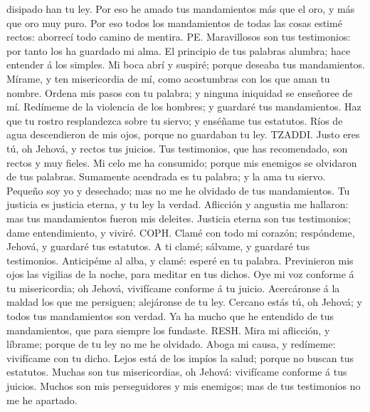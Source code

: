 disipado han tu ley.  Por eso he amado tus mandamientos
más que el oro, y más que oro muy puro.  Por eso todos los
mandamientos de todas las cosas estimé rectos: aborrecí todo camino de
mentira.  PE. Maravillosos son tus testimonios: por tanto
los ha guardado mi alma.  El principio de tus palabras
alumbra; hace entender á los simples.  Mi boca abrí y
suspiré; porque deseaba tus mandamientos.  Mírame, y ten
misericordia de mí, como acostumbras con los que aman tu nombre.
 Ordena mis pasos con tu palabra; y ninguna iniquidad se
enseñoree de mí.  Redímeme de la violencia de los hombres;
y guardaré tus mandamientos.  Haz que tu rostro
resplandezca sobre tu siervo; y enséñame tus estatutos. 
Ríos de agua descendieron de mis ojos, porque no guardaban tu ley.
 TZADDI. Justo eres tú, oh Jehová, y rectos tus juicios.
 Tus testimonios, que has recomendado, son rectos y muy
fieles.  Mi celo me ha consumido; porque mis enemigos se
olvidaron de tus palabras.  Sumamente acendrada es tu
palabra; y la ama tu siervo.  Pequeño soy yo y desechado;
mas no me he olvidado de tus mandamientos.  Tu justicia es
justicia eterna, y tu ley la verdad.  Aflicción y angustia
me hallaron: mas tus mandamientos fueron mis deleites. 
Justicia eterna son tus testimonios; dame entendimiento, y viviré.
 COPH. Clamé con todo mi corazón; respóndeme, Jehová, y
guardaré tus estatutos.  A ti clamé; sálvame, y guardaré
tus testimonios.  Anticipéme al alba, y clamé: esperé en
tu palabra.  Previnieron mis ojos las vigilias de la
noche, para meditar en tus dichos.  Oye mi voz conforme á
tu misericordia; oh Jehová, vivifícame conforme á tu juicio.
 Acercáronse á la maldad los que me persiguen; alejáronse
de tu ley.  Cercano estás tú, oh Jehová; y todos tus
mandamientos son verdad.  Ya ha mucho que he entendido de
tus mandamientos, que para siempre los fundaste.  RESH.
Mira mi aflicción, y líbrame; porque de tu ley no me he olvidado.
 Aboga mi causa, y redímeme: vivifícame con tu dicho.
 Lejos está de los impíos la salud; porque no buscan tus
estatutos.  Muchas son tus misericordias, oh Jehová:
vivifícame conforme á tus juicios.  Muchos son mis
perseguidores y mis enemigos; mas de tus testimonios no me he apartado.
